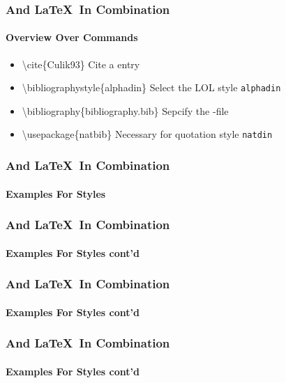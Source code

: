 \begin{frame}
\frametitle{\BibTeX And \LaTeX ~In Combination}
\framesubtitle{Overview Over Commands}
\begin{itemize}

\item \color{nounibaredI}\textbackslash cite\color{black}\{Culik93\} \hfill Cite a \BibTeX entry\\

\item \color{nounibaredI}\textbackslash bibliographystyle\color{black}\{alphadin\} \hfill Select the LOL style \glqq \texttt{alphadin}\grqq\\

\item \color{nounibaredI}\textbackslash bibliography\color{black}\{bibliography.bib\} \hfill Sepcify the  \BibTeX -file\\

\item \color{nounibaredI}\textbackslash usepackage\color{black}\{natbib\} \hfill Necessary for quotation style \texttt{natdin}\\


\end{itemize}


\end{frame}


\begin{frame}
\frametitle{\BibTeX And \LaTeX ~In Combination}
\framesubtitle{Examples For Styles}
\end{frame}


\begin{frame}
\frametitle{\BibTeX And \LaTeX ~In Combination}
\framesubtitle{Examples For Styles cont'd}
\end{frame}

\begin{frame}
\frametitle{\BibTeX And \LaTeX ~In Combination}
\framesubtitle{Examples For Styles cont'd}
\end{frame}


\begin{frame}
\frametitle{\BibTeX And \LaTeX ~In Combination}
\framesubtitle{Examples For Styles cont'd}
\end{frame}